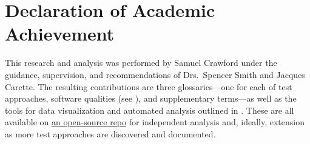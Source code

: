 \chapter{Declaration of Academic Achievement}
\label{chap:declaration_of_academic_achievement}

This research and analysis was performed by Samuel Crawford under the
guidance, supervision, and recommendations of Drs.~Spencer Smith and
Jacques Carette. The resulting contributions are three glossaries---one for
each of test approaches, software qualities (see ), and
supplementary terms---as well as the tools for data visualization and
automated analysis outlined in . These are all available on
\href{https://github.com/samm82/TestGen-Thesis}{an open-source repo}
for independent analysis and, ideally, extension as more test approaches are
discovered and documented.
